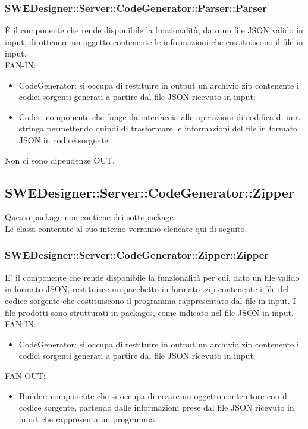 \documentclass[../PianoDiQualifica.tex]{subfiles}
\begin{document}
		\subsubsection{SWEDesigner::Server::CodeGenerator::Parser::Parser}
		È il componente che rende disponibile la funzionalità, dato un file JSON valido in input, di ottenere un oggetto contenente le informazioni che costituiscono il file in input.\\
		FAN-IN:
		\begin{itemize}
			\item CodeGenerator: si occupa di restituire in output un archivio zip contenente i codici sorgenti generati a partire dal file JSON ricevuto in input;
			\item Coder: componente che funge da interfaccia alle operazioni di codifica di una stringa permettendo quindi di trasformare le informazioni del file in formato JSON in codice sorgente.
		\end{itemize}
		Non ci sono dipendenze OUT.
		\subsection{SWEDesigner::Server::CodeGenerator::Zipper}
		Questo package non contiene dei sottopackage.\\
		Le classi contenute al suo interno verranno elencate qui di seguito.
		\subsubsection{SWEDesigner::Server::CodeGenerator::Zipper::Zipper}
		E' il componente che rende disponibile la funzionalità per cui, dato un file valido in formato JSON, restituisce un pacchetto in formato .zip contenente i file del codice sorgente che costituiscono il programma rappresentato dal file in input. I file prodotti sono strutturati in packages, come indicato nel file JSON in input.\\
		FAN-IN:
		\begin{itemize}
			\item CodeGenerator: si occupa di restituire in output un archivio zip contenente i codici sorgenti generati a partire dal file JSON ricevuto in input.
		\end{itemize}
		FAN-OUT:
		\begin{itemize}
			\item Builder: componente che si occupa di creare un oggetto contenitore con il codice sorgente, partendo dalle informazioni prese dal file JSON ricevuto in input che rappresenta un programma.
		\end{itemize}
\end{document}
